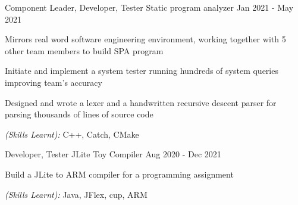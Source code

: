 

\begin{cventries}

  \cventry
    {Component Leader, Developer, Tester} %
    {Static program analyzer} %
    {} %
    {Jan 2021 - May 2021} %
    {
      \begin{cvitems} %
        \item {Mirrors real word software engineering environment, working together with 5 other team members to build SPA program}
        \item {Initiate and implement a system tester running hundreds of system queries improving team's accuracy}
        \item {Designed and wrote a lexer and a handwritten recursive descent parser for parsing thousands of lines of source code}
        \item {\textit{(Skills Learnt):} C++, Catch, CMake}
      \end{cvitems}
    }


  \cventry
    {Developer, Tester} %
    {JLite Toy Compiler} %
    {} %
    {Aug 2020 - Dec 2021} %
    {
      \begin{cvitems} %
        \item {Build a JLite to ARM compiler for a programming assignment}
        \item {\textit{(Skills Learnt):} Java, JFlex, cup, ARM}
      \end{cvitems}
    }



\end{cventries}
